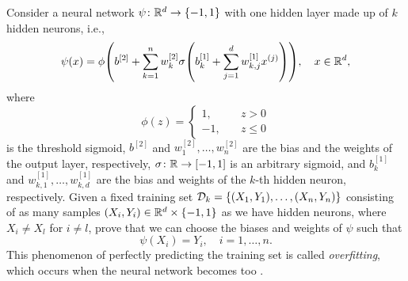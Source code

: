 \begin{exercise}
Consider a neural network $\psi \colon \R^d \to \set{-1, 1}$ with one hidden layer made up of $k$ hidden neurons, i.e.,
\[
    \psi(x) = \phi\left(b^{[2]} + \sum_{k=1}^n w_k^{[2]} \sigma\left(b_k^{[1]} + \sum_{j=1}^d w_{k, j}^{[1]} x^{(j)} \right)\right), \quad x \in \R^d,
\]
where
\[
    \phi(z) = \begin{cases}
        1, \quad & z > 0 \\
        -1, \quad & z \leq 0
    \end{cases}
\]
is the threshold sigmoid, $b^{[2]}$ and $w_1^{[2]}, \dots, w_n^{[2]}$ are the bias and the weights of the output layer, respectively, $\sigma \colon \mathbb{R} \to [-1, 1]$ is an arbitrary sigmoid, and $b_k^{[1]}$ and $w_{k, 1}^{[1]}, \dots, w_{k, d}^{[1]}$ are the bias and weights of the $k$-th hidden neuron, respectively. Given a fixed training set $\mathcal{D}_k = \set{(X_1, Y_1), \dots, (X_n, Y_n)}$ consisting of as many samples $(X_i, Y_i) \in \R^d \times \set{-1, 1}$ as we have hidden neurons, where $X_i \neq X_l$ for $i \neq l$, prove that we can choose the biases and weights of $\psi$ such that
\[
    \psi(X_i) = Y_i, \quad i = 1, \dots, n.
\]
This phenomenon of perfectly predicting the training set is called \emph{overfitting}, which occurs when the neural network becomes too .
\end{exercise}
